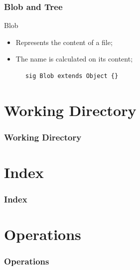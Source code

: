 \documentclass{beamer}
\begin{document}
\begin{frame}
   \frametitle{Blob and Tree}
   \begin{block}{Blob}
      \begin{itemize}
         \item Represents the content of a file;
         \item The name is calculated on its content;
      \end{itemize}
   \end{block}
      \tiny
      \begin{lstlisting}
      sig Blob extends Object {}
      \end{lstlisting}
\end{frame}

\section{Working Directory}
\begin{frame}
   \frametitle{Working Directory}
\end{frame}

\section{Index}
\begin{frame}
   \frametitle{Index}
\end{frame}

\section{Operations}
\begin{frame}
   \frametitle{Operations}
\end{frame}
\end{document}
